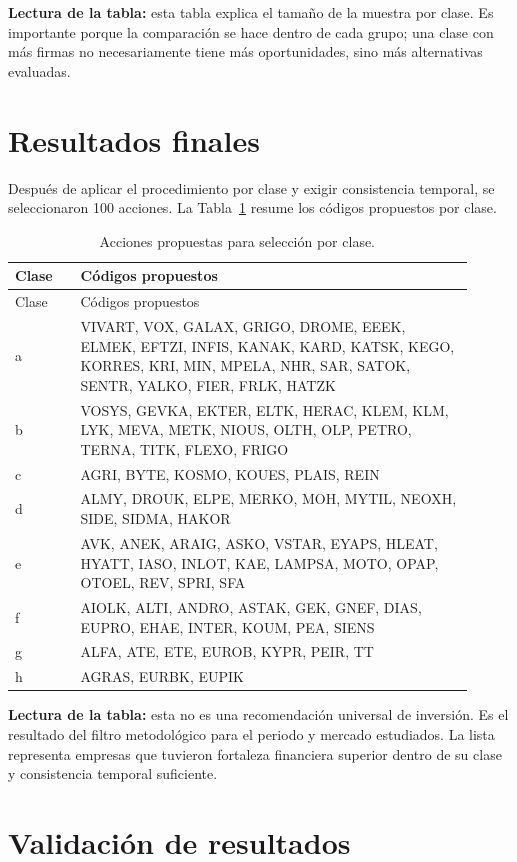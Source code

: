\documentclass[11pt,a4paper]{article}
\begin{document}
\textbf{Lectura de la tabla:} esta tabla explica el tamaño de la muestra por clase. Es importante porque la comparación se hace dentro de cada grupo; una clase con más firmas no necesariamente tiene más oportunidades, sino más alternativas evaluadas.

\section{Resultados finales}

Después de aplicar el procedimiento por clase y exigir consistencia temporal, se seleccionaron 100 acciones. La Tabla~\ref{tab:resultados} resume los códigos propuestos por clase.

\begin{longtable}{p{0.13\linewidth}p{0.78\linewidth}}
\caption{Acciones propuestas para selección por clase.}\label{tab:resultados}\\
\toprule
Clase & Códigos propuestos \\
\midrule
\endfirsthead
\toprule
Clase & Códigos propuestos \\
\midrule
\endhead
a & VIVART, VOX, GALAX, GRIGO, DROME, EEEK, ELMEK, EFTZI, INFIS, KANAK, KARD, KATSK, KEGO, KORRES, KRI, MIN, MPELA, NHR, SAR, SATOK, SENTR, YALKO, FIER, FRLK, HATZK \\
b & VOSYS, GEVKA, EKTER, ELTK, HERAC, KLEM, KLM, LYK, MEVA, METK, NIOUS, OLTH, OLP, PETRO, TERNA, TITK, FLEXO, FRIGO \\
c & AGRI, BYTE, KOSMO, KOUES, PLAIS, REIN \\
d & ALMY, DROUK, ELPE, MERKO, MOH, MYTIL, NEOXH, SIDE, SIDMA, HAKOR \\
e & AVK, ANEK, ARAIG, ASKO, VSTAR, EYAPS, HLEAT, HYATT, IASO, INLOT, KAE, LAMPSA, MOTO, OPAP, OTOEL, REV, SPRI, SFA \\
f & AIOLK, ALTI, ANDRO, ASTAK, GEK, GNEF, DIAS, EUPRO, EHAE, INTER, KOUM, PEA, SIENS \\
g & ALFA, ATE, ETE, EUROB, KYPR, PEIR, TT \\
h & AGRAS, EURBK, EUPIK \\
\bottomrule
\end{longtable}

\textbf{Lectura de la tabla:} esta no es una recomendación universal de inversión. Es el resultado del filtro metodológico para el periodo y mercado estudiados. La lista representa empresas que tuvieron fortaleza financiera superior dentro de su clase y consistencia temporal suficiente.

\section{Validación de resultados}
\end{document}

